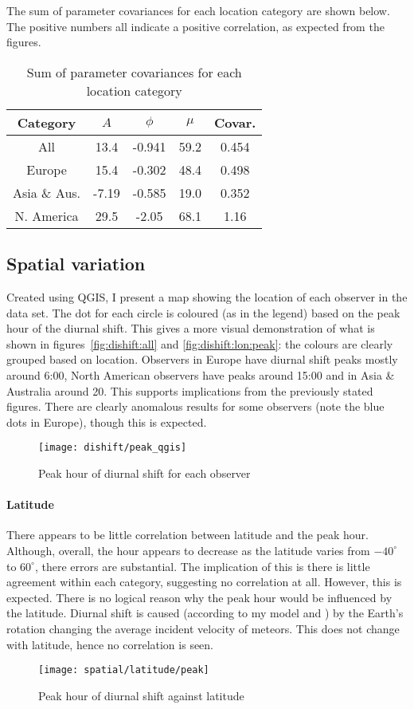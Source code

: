 The sum of parameter covariances for each location category are shown below. The positive numbers all indicate a positive correlation, as expected from the figures. 
\begin{table}[h!]
	\begin{tabular}{ccccc}
		\hline
		Category & $A$ & $\phi$ & $\mu$ & Covar. \\ \hline
		All & 13.4 & -0.941 & 59.2 & 0.454 \\
		Europe & 15.4 & -0.302 & 48.4 & 0.498 \\
		Asia \& Aus. & -7.19 & -0.585 & 19.0 & 0.352 \\
		N. America & 29.5 & -2.05 & 68.1 & 1.16 \\
		\hline
	\end{tabular}
	\caption{Sum of parameter covariances for each location category}
\end{table}

\subsection{Spatial variation}
Created using QGIS, I present a map showing the location of each observer in the data set. The dot for each circle is coloured (as in the legend) based on the peak hour of the diurnal shift. This gives a more visual demonstration of what is shown in figures~\ref{fig:dishift:all} and \ref{fig:dishift:lon:peak}: the colours are clearly grouped based on location. Observers in Europe have diurnal shift peaks mostly around 6:00, North American observers have peaks around 15:00 and in Asia \& Australia around 20. This supports implications from the previously stated figures. There are clearly anomalous results for some observers (note the blue dots in Europe), though this is expected.
\begin{figure}[h!]
	\centering
	\texttt{[image: dishift/peak\_qgis]}
	\caption{Peak hour of diurnal shift for each observer
		\label{fig:dishift:qgis}}
\end{figure}
\paragraph{Latitude\\}
There appears to be little correlation between latitude and the peak hour. Although, overall, the hour appears to decrease as the latitude varies from $-40^{\circ}$ to $60^{\circ}$, there errors are substantial. The implication of this is there is little agreement within each category, suggesting no correlation at all. However, this is expected. There is no logical reason why the peak hour would be influenced by the latitude. Diurnal shift is caused (according to my model and \cite{baa}) by the Earth's rotation changing the average incident velocity of meteors. This does not change with latitude, hence no correlation is seen.
\begin{figure}[h!]
	\centering
	\texttt{[image: spatial/latitude/peak]}
	\caption{Peak hour of diurnal shift against latitude
		\label{fig:dishift:lat:peak}}
\end{figure}

